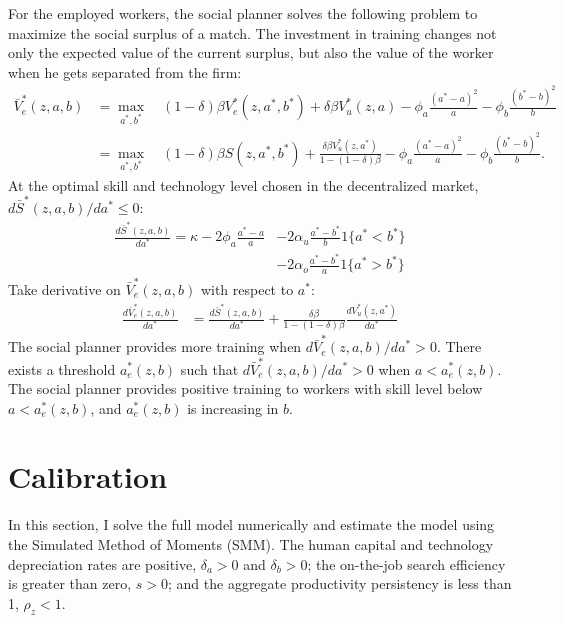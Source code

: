 \documentclass[12pt]{article}
\newcommand{\1}{\mathbb{1}}
\begin{document}
For the employed workers, the social planner solves the following problem to maximize the social surplus of a match. The investment in training changes not only the expected value of the current surplus, but also the value of the worker when he gets separated from the firm: 
\begin{align*}
\bar{V}_e^*(z,a,b) &= \max_{a^*,b^*} \quad (1-\delta)\beta V_e^*(z,a^*,b^*)+\delta\beta V_u^*(z,a)-\phi_a\frac{(a^*-a)^2}{a}-\phi_b\frac{(b^*-b)^2}{b} \\
 &= \max_{a^*,b^*} \quad (1-\delta)\beta S(z,a^*,b^*)+\frac{\delta\beta V_u^*(z,a^*)}{1-(1-\delta)\beta}-\phi_a\frac{(a^*-a)^2}{a}-\phi_b\frac{(b^*-b)^2}{b}.
\end{align*}
At the optimal skill and technology level chosen in the decentralized market, $d\bar{S}^*(z,a,b)/d a^* \leq 0 $:  
\begin{align*}
\frac{d\bar{S}^*(z,a,b)}{d a^*} = \kappa-2\phi_a\frac{a^*-a}{a} &-2\alpha_u\frac{a^*-b^*}{b}1\{a^*<b^*\}	\\
																									&-2\alpha_o\frac{a^*-b^*}{a}1\{a^*>b^*\}
\end{align*}
Take derivative on $\bar{V}_e^*(z,a,b)$ with respect to $a^*$: 
\begin{align*}
\frac{d\bar{V}_e^*(z,a,b)}{d a^*}  & = \frac{d\bar{S}^*(z,a,b)}{d a^*} + \frac{\delta\beta}{1-(1-\delta)\beta}\frac{d V_u^*(z,a^*)}{d a^*} 
\end{align*}
The social planner provides more training when $d\bar{V}_e^*(z,a,b)/d a^*>0$. There exists a threshold $a_e^{*}(z,b)$ such that $d\bar{V}_e^*(z,a,b)/d a^*>0$ when $a<a_e^{*}(z,b)$. The social planner provides positive training to workers with skill level below $a<a_e^{*}(z,b)$, and $a_e^{*}(z,b)$ is increasing in $b$.  


\section{Calibration}
In this section, I solve the full model numerically and estimate the model using the Simulated Method of Moments (SMM). The human capital and technology depreciation rates are positive, $\delta_a>0$ and $\delta_b>0$; the on-the-job search efficiency is greater than zero, $s>0$; and the aggregate productivity persistency is less than 1, $\rho_z<1$. 
\end{document}
